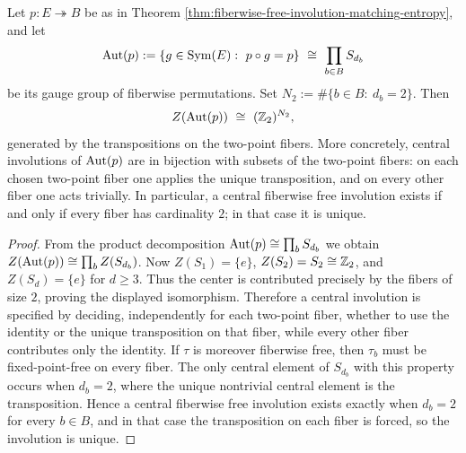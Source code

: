 \begin{corollary}\label{cor:autp-center-z2-by-twofibers}
Let \(p:E\twoheadrightarrow B\) be as in Theorem \ref{thm:fiberwise-free-involution-matching-entropy}, and let
\[
\operatorname{Aut}(p):=\{g\in\operatorname{Sym}(E):\ p\circ g=p\}\ \cong\ \prod_{b\in B} S_{d_b}
\]
be its gauge group of fiberwise permutations.
Set \(N_2:=\#\{b\in B:\ d_b=2\}\).
Then
\[
Z(\Aut(p))\ \cong\ (\ZZ_2)^{N_2},
\]
generated by the transpositions on the two-point fibers.
More concretely, central involutions of \(\operatorname{Aut}(p)\) are in bijection with subsets of the two-point fibers: on each chosen two-point fiber one applies the unique transposition, and on every other fiber one acts trivially.
In particular, a central fiberwise free involution exists if and only if every fiber has cardinality \(2\); in that case it is unique.
\end{corollary}
\begin{proof}
From the product decomposition \(\operatorname{Aut}(p)\cong \prod_b S_{d_b}\) we obtain
\(
Z(\operatorname{Aut}(p))\cong\prod_b Z(S_{d_b})
\).
Now \(Z(S_1)=\{e\}\), \(Z(S_2)=S_2\cong\mathbb{Z}_2\), and \(Z(S_d)=\{e\}\) for \(d\ge 3\).
Thus the center is contributed precisely by the fibers of size \(2\), proving the displayed isomorphism.
Therefore a central involution is specified by deciding, independently for each two-point fiber, whether to use the identity or the unique transposition on that fiber, while every other fiber contributes only the identity.
If \(\tau\) is moreover fiberwise free, then \(\tau_b\) must be fixed-point-free on every fiber.
The only central element of \(S_{d_b}\) with this property occurs when \(d_b=2\), where the unique nontrivial central element is the transposition.
Hence a central fiberwise free involution exists exactly when \(d_b=2\) for every \(b\in B\), and in that case the transposition on each fiber is forced, so the involution is unique. \qedhere
\end{proof}

